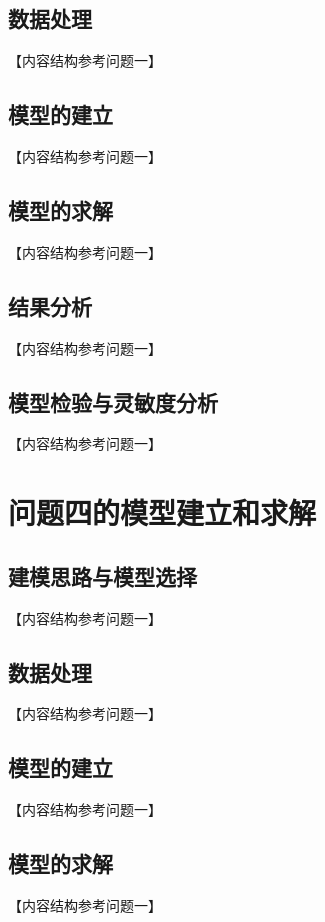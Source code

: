 \documentclass[withoutpreface,bwprint]{cumcmthesis}
\begin{document}
\subsection{数据处理}
【内容结构参考问题一】

\subsection{模型的建立}
【内容结构参考问题一】

\subsection{模型的求解}
【内容结构参考问题一】

\subsection{结果分析}
【内容结构参考问题一】

\subsection{模型检验与灵敏度分析}
【内容结构参考问题一】

\newpage
\section{问题四的模型建立和求解}

\subsection{建模思路与模型选择}
【内容结构参考问题一】

\subsection{数据处理}
【内容结构参考问题一】

\subsection{模型的建立}
【内容结构参考问题一】

\subsection{模型的求解}
【内容结构参考问题一】
\end{document}
